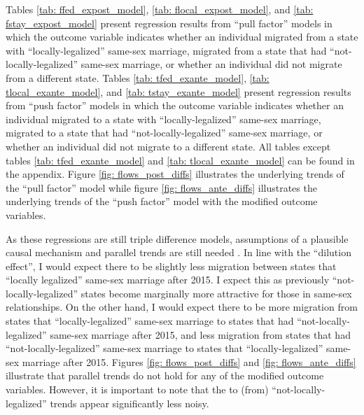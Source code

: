 \documentclass[12pt,letterpaper]{article}
\begin{document}
Tables \ref{tab: ffed_expost_model}, \ref{tab: flocal_expost_model}, and \ref{tab: fstay_expost_model} present regression results from “pull factor” models in which the outcome variable indicates whether an individual migrated from a state with “locally-legalized” same-sex marriage, migrated from a state that had “not-locally-legalized” same-sex marriage, or whether an individual did not migrate from a different state. Tables \ref{tab: tfed_exante_model}, \ref{tab: tlocal_exante_model}, and \ref{tab: tstay_exante_model} present regression results from “push factor” models in which the outcome variable indicates whether an individual migrated to a state with “locally-legalized” same-sex marriage, migrated to a state that had “not-locally-legalized” same-sex marriage, or whether an individual did not migrate to a different state. All tables except tables \ref{tab: tfed_exante_model} and \ref{tab: tlocal_exante_model} can be found in the appendix. Figure \ref{fig: flows_post_diffs} illustrates the underlying trends of the “pull factor” model while figure \ref{fig: flows_ante_diffs} illustrates the underlying trends of the “push factor” model with the modified outcome variables.

As these regressions are still triple difference models, assumptions of a plausible causal mechanism and parallel trends are still needed \citep{24, 25}. In line with the “dilution effect”, I would expect there to be slightly less migration between states that “locally legalized” same-sex marriage after 2015. I expect this as previously “not-locally-legalized” states become marginally more attractive for those in same-sex relationships. On the other hand, I would expect there to be more migration from states that “locally-legalized” same-sex marriage to states that had “not-locally-legalized” same-sex marriage after 2015, and less migration from states that had “not-locally-legalized” same-sex marriage to states that “locally-legalized” same-sex marriage after 2015. Figures \ref{fig: flows_post_diffs} and \ref{fig: flows_ante_diffs} illustrate that parallel trends do not hold for any of the modified outcome variables. However, it is important to note that the to (from) “not-locally-legalized” trends appear significantly less noisy.
\end{document}
